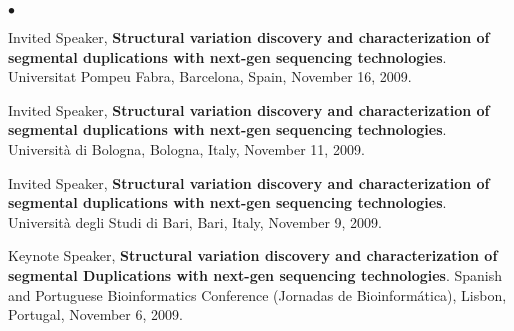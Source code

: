 \documentclass[margin,line]{res}
\newenvironment{list2}{
  \begin{list}{$\bullet$}{%
      \setlength{\itemsep}{0.1cm}
      \setlength{\parsep}{0in} \setlength{\parskip}{0in}
      \setlength{\topsep}{0in} \setlength{\partopsep}{0in} 
      \setlength{\leftmargin}{0.2in}}}{\end{list}}
\newcommand{\junk}[1]{}
\begin{document}
\begin{resume}
\begin{list2}
{  
\item 
  Invited Speaker, {\bf Structural variation discovery and characterization of segmental duplications with next-gen sequencing technologies}.
  Universitat Pompeu Fabra,
  Barcelona, Spain, November 16, 2009.

\item 
  Invited Speaker, {\bf Structural variation discovery and characterization of segmental duplications with next-gen sequencing technologies}.
  Universit\`{a} di Bologna,
  Bologna, Italy, November 11, 2009.

\item 
  Invited Speaker, {\bf Structural variation discovery and characterization of segmental duplications with next-gen sequencing technologies}.
  Universit\`{a} degli Studi di Bari, 
  Bari, Italy, November 9, 2009.
}

\item 
  Keynote Speaker, {\bf Structural variation discovery and characterization of segmental Duplications with next-gen sequencing technologies}.
 Spanish and Portuguese Bioinformatics Conference (Jornadas de Bioinform\'{a}tica),
 Lisbon, Portugal, November 6, 2009.

\junk{
\item 
  Invited Speaker, {\bf Characterization of structural variation and segmental duplications using next-gen sequencing technology}.
  The Mediterranean Medical Genetics Meeting 2009, Ankara, Turkey, June 30, 2009. 

\item
  Conference Talk, 
  {\bf Organization and evolution of primate centromeric DNA
from whole genome shotgun sequence data}.  $16^{th}$ Annual
International Conference Intelligent Systems for Molecular Biology (ISMB 2008), {\em Highlights Track},
Toronto, ON, Canada, July 22, 2008.

\item
  Workshop Talk, {\bf Personalized copy-number and segmental duplication maps using next-gen sequencing technology}.
Special Interest Group on Algorithms for Short Read Assembly, Alignment \& Variation Analysis at the
 $16^{th}$ Annual
International Conference Intelligent Systems for Molecular Biology (ISMB 2008),
Toronto, ON, Canada, July 19, 2008.

\item
  Invited Speaker, {\bf Organization and evolution of primate centromeric DNA
from whole genome shotgun sequence data}. Bilkent University Center for Bioinformatics,
Ankara, Turkey, July 20, 2007.

}
\end{list2}
\end{resume}
\end{document}
